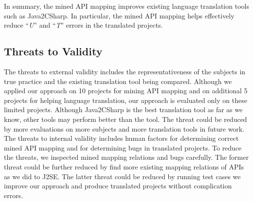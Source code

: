 In summary, the mined API mapping improves existing language
translation tools such as Java2CSharp. In particular, the mined API
mapping helps effectively reduce ``\emph{U}'' and ``\emph{T}''
errors in the translated projects.


\subsection{Threats to Validity}
\label{sec:evaluation:threats} The threats to external validity
includes the representativeness of the subjects in true practice and
the existing translation tool being compared. Although we applied
our approach on 10 projects for mining API mapping and on additional
5 projects for helping language translation, our approach is
evaluated only on these limited projects. Although Java2CSharp is
the best translation tool as far as we know, other tools may perform
better than the tool. The threat could be reduced by more
evaluations on more subjects and more translation tools in future
work. The threats to internal validity includes human factors for
determining correct mined API mapping and for determining bugs in
translated projects. To reduce the threats, we inspected mined
mapping relations and bugs carefully. The former threat could be
further reduced by find more existing mapping relations of APIs as
we did to J2SE. The latter threat could be reduced by running test
cases we improve our approach and produce translated projects
without complication errors.
